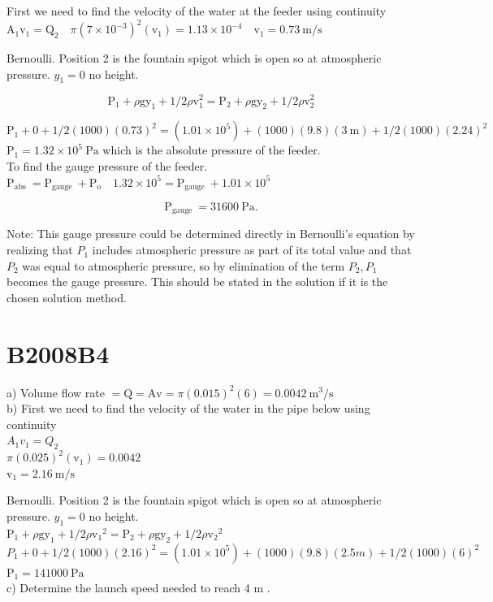 \begin{enumerate}
First we need to find the velocity of the water at the feeder using continuity $\mathrm{A}_{1} \mathrm{v}_{1}=\mathrm{Q}_{2} \quad \pi\left(7 \times 10^{-3}\right)^{2}\left(\mathrm{v}_{1}\right)=1.13 \times 10^{-4} \quad \mathrm{v}_{1}=0.73 \mathrm{~m} / \mathrm{s}$

Bernoulli. Position 2 is the fountain spigot which is open so at atmospheric pressure. $y_{1}=0$ no height.

$$
\mathrm{P}_{1}+\rho \mathrm{gy}_{1}+1 / 2 \rho \mathrm{v}_{1}^{2}=\mathrm{P}_{2}+\rho \mathrm{gy}_{2}+1 / 2 \rho \mathrm{v}_{2}^{2}
$$

$\mathrm{P}_{1}+0+1 / 2(1000)(0.73)^{2}=\left(1.01 \times 10^{5}\right)+(1000)(9.8)(3 \mathrm{~m})+1 / 2(1000)(2.24)^{2}$\\
$\mathrm{P}_{1}=1.32 \times 10^{5} \mathrm{~Pa}$ which is the absolute pressure of the feeder.\\
To find the gauge pressure of the feeder. $\mathrm{P}_{\text {abs }}=\mathrm{P}_{\text {gauge }}+\mathrm{P}_{\mathrm{o}} \quad 1.32 \times 10^{5}=\mathrm{P}_{\text {gauge }}+1.01 \times 10^{5}$

$$
\mathrm{P}_{\text {gauge }}=31600 \mathrm{~Pa} .
$$

Note: This gauge pressure could be determined directly in Bernoulli's equation by realizing that $P_{1}$ includes atmospheric pressure as part of its total value and that $P_{2}$ was equal to atmospheric pressure, so by elimination of the term $P_{2}, P_{1}$ becomes the gauge pressure. This should be stated in the solution if it is the chosen solution method.

\section*{B2008B4}
a) Volume flow rate $=\mathrm{Q}=\mathrm{Av}=\pi(0.015)^{2}(6)=0.0042 \mathrm{~m}^{3} / \mathrm{s}$\\
b) First we need to find the velocity of the water in the pipe below using continuity\\
$A_{1} v_{1}=Q_{2}$\\
$\pi(0.025)^{2}\left(\mathrm{v}_{1}\right)=0.0042$\\
$\mathrm{v}_{1}=2.16 \mathrm{~m} / \mathrm{s}$

Bernoulli. Position 2 is the fountain spigot which is open so at atmospheric pressure. $y_{1}=0$ no height.\\
$\mathrm{P}_{1}+\rho \mathrm{gy}_{1}+1 / 2 \rho \mathrm{v}_{1}{ }^{2}=\mathrm{P}_{2}+\rho \mathrm{gy}_{2}+1 / 2 \rho \mathrm{v}_{2}{ }^{2}$\\
$P_{1}+0+1 / 2(1000)(2.16)^{2}=\left(1.01 \times 10^{5}\right)+(1000)(9.8)(2.5 m)+1 / 2(1000)(6)^{2}$\\
$\mathrm{P}_{1}=141000 \mathrm{~Pa}$\\
c) Determine the launch speed needed to reach 4 m .


\end{enumerate}
